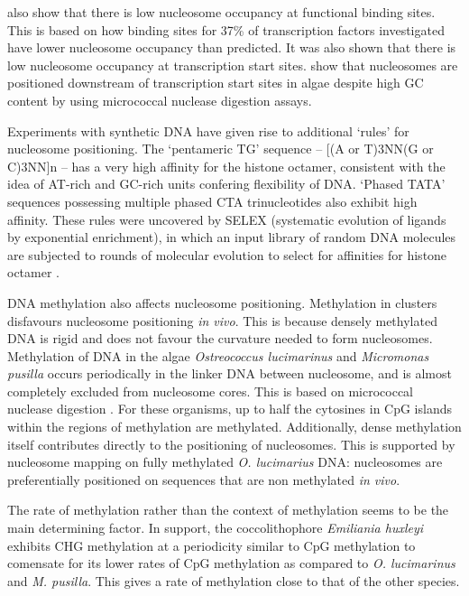 \documentclass[parskip=full, numbers=noenddot]{scrreprt}
\begin{document}
\citet{segal_genomic_2006} also show that there is low nucleosome occupancy at functional binding sites.  This is based on how binding sites for 37\% of transcription factors investigated have lower nucleosome occupancy than predicted.  It was also shown that there is low nucleosome occupancy at transcription start sites.  \citet{huff_dnmt1-independent_2014} show that nucleosomes are positioned downstream of transcription start sites in algae despite high GC content by using micrococcal nuclease digestion assays.

Experiments with synthetic DNA have given rise to additional `rules' for nucleosome positioning.  The `pentameric TG' sequence -- [(A or T)3NN(G or C)3NN]n -- has a very high affinity for the histone octamer, consistent with the idea of AT-rich and GC-rich units confering flexibility of DNA.  `Phased TATA' sequences possessing multiple phased CTA trinucleotides also exhibit high affinity.  These rules were uncovered by SELEX (systematic evolution of ligands by exponential enrichment), in which an input library of random DNA molecules are subjected to rounds of molecular evolution to select for affinities for histone octamer \cite{lowary_new_1998}.


DNA methylation also affects nucleosome positioning.  Methylation in clusters disfavours nucleosome positioning \emph{in vivo}. This is because densely methylated DNA is rigid and does not favour the curvature needed to form nucleosomes.
Methylation of DNA in the algae \emph{Ostreococcus lucimarinus} and \emph{Micromonas pusilla} occurs periodically in the linker DNA between nucleosome, and is almost completely excluded from nucleosome cores.  This is based on micrococcal nuclease digestion \citep{huff_dnmt1-independent_2014}.  For these organisms, up to half the cytosines in CpG islands within the regions of methylation are methylated.  Additionally, dense methylation itself contributes directly to the positioning of nucleosomes.  This is supported by nucleosome mapping on fully methylated \emph{O. lucimarius} DNA: nucleosomes are preferentially positioned on sequences that are non methylated \emph{in vivo}.

The rate of methylation rather than the context of methylation seems to be the main determining factor.  In support, the coccolithophore \emph{Emiliania huxleyi} exhibits CHG methylation at a periodicity similar to CpG methylation to comensate for its lower rates of CpG methylation as compared to \emph{O. lucimarinus} and \emph{M. pusilla}.  This gives a rate of methylation close to that of the other species.
\end{document}
